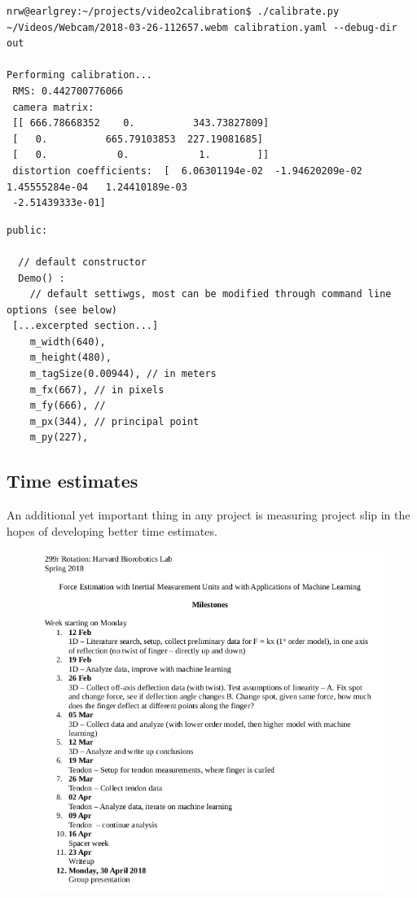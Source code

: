 \documentclass[12pt]{article}
\begin{document}
\begin{lstlisting}
nrw@earlgrey:~/projects/video2calibration$ ./calibrate.py ~/Videos/Webcam/2018-03-26-112657.webm calibration.yaml --debug-dir out

Performing calibration...
 RMS: 0.442700776066
 camera matrix:
 [[ 666.78668352    0.          343.73827809]
 [   0.          665.79103853  227.19081685]
 [   0.            0.            1.        ]]
 distortion coefficients:  [  6.06301194e-02  -1.94620209e-02   1.45555284e-04   1.24410189e-03
 -2.51439333e-01]
\end{lstlisting}


\begin{lstlisting}
public:

  // default constructor
  Demo() :
    // default settiwgs, most can be modified through command line options (see below)
 [...excerpted section...]
    m_width(640),
    m_height(480),
    m_tagSize(0.00944), // in meters
    m_fx(667), // in pixels
    m_fy(666), //
    m_px(344), // principal point
    m_py(227),
\end{lstlisting}

\subsection{Time estimates}

An additional yet important thing in any project is measuring project slip in the hopes of
developing better time estimates. 

\begin{figure}[H]
\centering
\includegraphics[width=.8\textwidth]{images/misc/timeline.png}
\end{figure}
\end{document}
